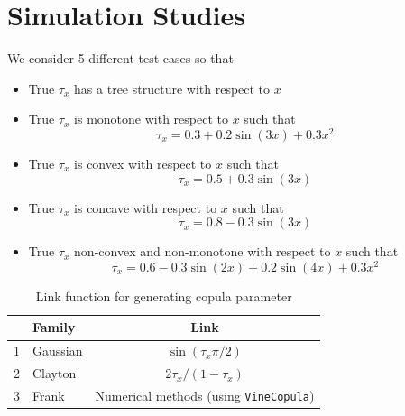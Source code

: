 \documentclass{amsart}
\begin{document}
\section{Simulation Studies}

We consider 5 different test cases so that 
\begin{itemize}
    \item True $\tau_x$ has a tree structure with respect to $x$
    \item True $\tau_x$ is monotone with respect to $x$ such that 
    \begin{equation}
        \tau_x = 0.3 + 0.2 \sin(3x) + 0.3x^2
    \end{equation}
    \item True $\tau_x$ is convex with respect to $x$ such that 
    \begin{equation}
        \tau_x = 0.5 + 0.3 \sin(3x)
    \end{equation}
    \item True $\tau_x$ is concave with respect to $x$ such that 
    \begin{equation}
        \tau_x = 0.8 - 0.3 \sin(3x)
    \end{equation}
    \item True $\tau_x$ non-convex and non-monotone with respect to $x$ such that 
    \begin{equation}
        \tau_x = 0.6 - 0.3 \sin(2x) + 0.2 \sin(4x) + 0.3 x^2
    \end{equation}
\end{itemize}


\begin{table}
    \centering
    \begin{tabular}{c|l|c}
    \toprule
         & Family & Link \\
         \midrule
        1 & Gaussian & $\sin(\tau_x\pi/2)$ \\
        2 & Clayton & $2\tau_x/(1-\tau_x)$ \\
        3 & Frank & Numerical methods (using \texttt{VineCopula})\\
        \bottomrule
    \end{tabular}
    \caption{Link function for generating copula parameter}
    \label{tab:cop:link}
\end{table}

\end{document}
